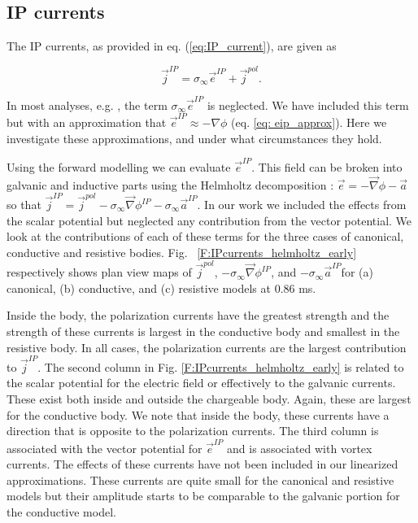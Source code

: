 \documentclass[extra,mreferee]{gji}
\newcommand{\grad}{\vec \nabla}
\newcommand{\siginf}{\sigma_\infty}
\renewcommand {\j}  { {\vec j} }
\newcommand {\e}  { {\vec e} }
\begin{document}
\subsection{IP currents}
The IP currents, as provided in eq. (\ref{eq:IP_current}), are given as
\begin{linenomath*}
\begin{equation}
  \j^{IP}=\siginf  \e^{IP} + \j^{pol}.
\end{equation}
\end{linenomath*}

In most analyses, e.g. \cite{Smith1988a}, the term $\siginf \e^{IP}$ is neglected. We have included this term but with an approximation that $\e^{IP} \approx -\nabla \phi$  (eq. \ref{eq: eip_approx}). Here we investigate these approximations, and under what circumstances they hold.

Using the forward modelling we can evaluate $\e^{IP}$.
This field can be broken into galvanic and inductive parts using the Helmholtz decomposition \cite[]{Bladel}: $\e=-\grad \phi-\vec{a}$ so that $\j^{IP} = \j^{pol} -\siginf \grad\phi^{IP} - \siginf \vec{a}^{IP}$.
In our work we included the effects from the scalar potential but neglected any contribution from the vector potential. We look at the contributions of each of these terms  for the three cases of canonical, conductive and resistive bodies.
Fig. ~\ref{F:IPcurrents_helmholtz_early} respectively shows plan view maps of $\j^{pol}$, $-\siginf \grad\phi^{IP}$, and $-\siginf \vec{a}^{IP}$for (a) canonical, (b) conductive, and (c) resistive models at 0.86 ms.

Inside the body, the polarization currents have the greatest strength and the strength of these currents is largest in the conductive body and smallest in the resistive body.
In all cases, the polarization currents are the largest contribution to $\j^{IP}$.
The second column in Fig. \ref{F:IPcurrents_helmholtz_early} is related to the scalar potential for the electric field or effectively to the galvanic currents.
These exist both inside and outside the chargeable body.
Again, these are largest for the conductive body.
We note that inside the body, these currents have a direction that is opposite to the polarization currents.
The third column is associated with the vector potential for $\e^{IP}$ and is associated with vortex currents.
The effects of these currents have not been included in our linearized approximations. These currents are quite small for the canonical and resistive models but their amplitude starts to be comparable to the galvanic portion for the conductive model.
\end{document}
